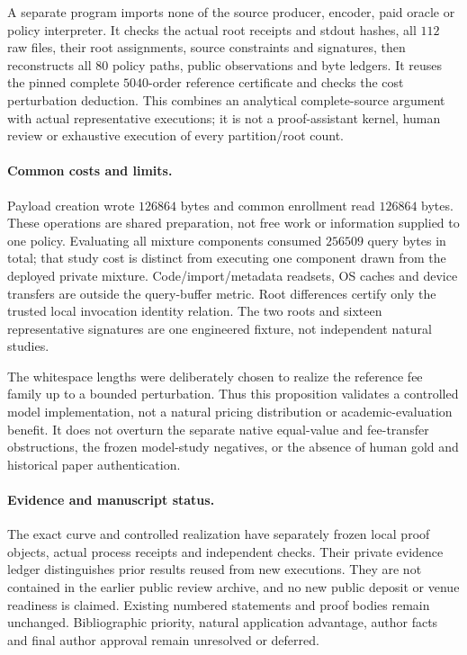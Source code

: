 A separate program imports none of the source producer, encoder, paid oracle or policy interpreter. It checks the actual root receipts and stdout hashes, all $112$ raw files, their root assignments, source constraints and signatures, then reconstructs all $80$ policy paths, public observations and byte ledgers. It reuses the pinned complete $5040$-order reference certificate and checks the cost perturbation deduction. This combines an analytical complete-source argument with actual representative executions; it is not a proof-assistant kernel, human review or exhaustive execution of every partition/root count.

\paragraph*{Common costs and limits.}
Payload creation wrote $126864$ bytes and common enrollment read $126864$ bytes. These operations are shared preparation, not free work or information supplied to one policy. Evaluating all mixture components consumed $256509$ query bytes in total; that study cost is distinct from executing one component drawn from the deployed private mixture. Code/import/metadata readsets, OS caches and device transfers are outside the query-buffer metric. Root differences certify only the trusted local invocation identity relation. The two roots and sixteen representative signatures are one engineered fixture, not independent natural studies.

The whitespace lengths were deliberately chosen to realize the reference fee family up to a bounded perturbation. Thus this proposition validates a controlled model implementation, not a natural pricing distribution or academic-evaluation benefit. It does not overturn the separate native equal-value and fee-transfer obstructions, the frozen model-study negatives, or the absence of human gold and historical paper authentication.

\paragraph*{Evidence and manuscript status.}
The exact curve and controlled realization have separately frozen local proof objects, actual process receipts and independent checks. Their private evidence ledger distinguishes prior results reused from new executions. They are not contained in the earlier public review archive, and no new public deposit or venue readiness is claimed. Existing numbered statements and proof bodies remain unchanged. Bibliographic priority, natural application advantage, author facts and final author approval remain unresolved or deferred.
